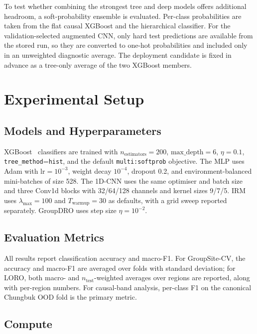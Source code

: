 \documentclass[sensors,article,submit,pdftex,oneauthor]{Definitions/mdpi}
\begin{document}
To test whether combining the strongest tree and deep models
offers additional headroom, a soft-probability ensemble is
evaluated. Per-class probabilities are taken from the flat
causal XGBoost and the hierarchical classifier. For the
validation-selected augmented CNN, only hard test predictions
are available from the stored run, so they are converted to
one-hot probabilities and included only in an unweighted
diagnostic average. The deployment candidate is fixed in
advance as a tree-only average of the two XGBoost members.

\section{Experimental Setup}\label{sec:setup}

\subsection{Models and Hyperparameters}

XGBoost~\cite{chen2016xgboost} classifiers are trained with
$n_\text{estimators} = 200$, $\text{max\_depth} = 6$,
$\eta = 0.1$, \texttt{tree\_method}=\texttt{hist}, and the
default \texttt{multi:softprob} objective. The MLP uses Adam
with $\text{lr} = 10^{-3}$, weight decay $10^{-4}$, dropout
0.2, and environment-balanced mini-batches of size 528. The
1D-CNN uses the same optimiser and batch size and three
Conv1d blocks with 32/64/128 channels and kernel sizes
9/7/5. IRM uses $\lambda_{\max} = 100$ and
$T_\mathrm{warmup} = 30$ as defaults, with a grid sweep
reported separately. GroupDRO uses step size $\eta = 10^{-2}$.

\subsection{Evaluation Metrics}

All results report classification accuracy and macro-F1.
For GroupSite-CV, the accuracy and macro-F1 are averaged
over folds with standard deviation; for LORO, both macro-
and $n_\text{test}$-weighted averages over regions are
reported, along with per-region numbers. For causal-band
analysis, per-class F1 on the canonical Chungbuk OOD fold
is the primary metric.

\subsection{Compute}
\end{document}
